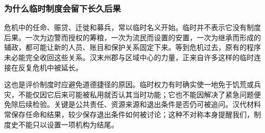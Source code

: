 \subsubsection{为什么临时制度会留下长久后果}

危机中的任命、赈贷、迁徙和募兵，常以临时名义开始。临时并不表示它没有制度后果。一次为边警而授权的筹粮，一次为流民而设置的安置，一次为继承而形成的辅政，都可能让新的人员、账目和保护关系固定下来。等到危机过去，原有的程序未必能完全收回这些关系。汉末州郡与区域中心的力量，正来自许多这样的临时连接在反复危机中被延长。

这也是评价制度时应避免道德捷径的原因。临时权力有时确实使一地免于饥荒或兵灾，不能仅因它后来可能被私用就否认其当时功能；它也不能因解决了紧急问题便免除后续检验。关键是公共责任、资源来源和退出条件是否仍可被追问。汉代材料常保存任命和结果，较少保存退出条件如何被讨论；这种不对称本身提醒我们，制度史不能只以设置一项机构为结尾。
